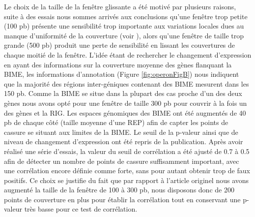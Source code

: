 \documentclass[12pt,a4paper]{report}
\begin{document}
\begin{onehalfspace}
Le choix de la taille de la fenêtre glissante a été motivé par plusieurs raisons, suite à des essais nous sommes arrivés aux conclusions qu'une fenêtre trop petite (100 pb) présente une sensibilité trop importante aux variations locales dues au manque d'uniformité de la couverture (voir ), alors qu'une fenêtre de taille trop grande (500 pb) produit une perte de sensibilité en lissant les couvertures de chaque moitié de la fenêtre. L'idée étant de rechercher le changement d'expression en ayant des informations sur la couverture moyenne des gènes flanquant la BIME, les informations d'annotation (Figure \autoref{fig:operonFigB}) nous indiquent que la majorité des régions inter-géniques contenant des BIME mesurent dans les 150 pb. Comme la BIME se situe dans la plupart des cas proche d'un des deux gènes nous avons opté pour une fenêtre de taille 300 pb pour couvrir à la fois un des gènes et la RIG. Les espaces génomiques des BIME ont été augmentés de 40 pb de chaque côté (taille moyenne d'une REP) afin de capter les points de cassure se situant aux limites de la BIME. Le seuil de la p-valeur ainsi que de niveau de changement d'expression ont été repris de la publication. Après avoir réalisé une série d'essais, la valeur du seuil de corrélation a été ajusté de 0.7 à 0.5 afin de détecter un nombre de points de cassure suffisamment important, avec une corrélation encore définie comme forte, sans pour autant obtenir trop de faux positifs. Ce choix se justifie du fait que par rapport à l'article originel nous avons augmenté la taille de la fenêtre de 100 à 300 pb, nous disposons donc de 200 points de couverture en plus pour établir la corrélation tout en conservant une p-valeur très basse pour ce test de corrélation. 


\end{onehalfspace}
\end{document}
